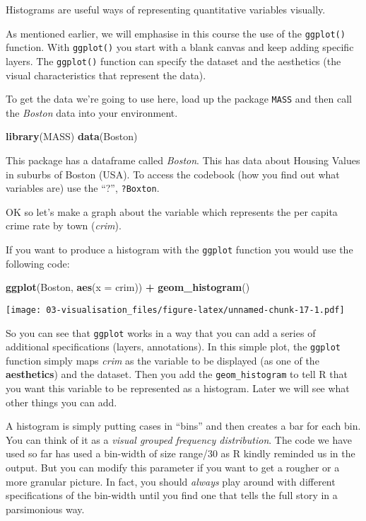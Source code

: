 \documentclass[
]{book}
\newenvironment{Shaded}{\begin{snugshade}}{\end{snugshade}}
\newcommand{\AttributeTok}[1]{\textcolor[rgb]{0.13,0.29,0.53}{#1}}
\newcommand{\FunctionTok}[1]{\textcolor[rgb]{0.13,0.29,0.53}{\textbf{#1}}}
\newcommand{\NormalTok}[1]{#1}
\newcommand{\SpecialCharTok}[1]{\textcolor[rgb]{0.81,0.36,0.00}{\textbf{#1}}}
\begin{document}
Histograms are useful ways of representing quantitative variables visually.

As mentioned earlier, we will emphasise in this course the use of the \texttt{ggplot()} function. With \texttt{ggplot()} you start with a blank canvas and keep adding specific layers. The \texttt{ggplot()} function can specify the dataset and the aesthetics (the visual characteristics that represent the data).

To get the data we're going to use here, load up the package \texttt{MASS} and then call the \emph{Boston} data into your environment.

\begin{Shaded}
\begin{Highlighting}[]
\FunctionTok{library}\NormalTok{(MASS)}
\FunctionTok{data}\NormalTok{(Boston)}
\end{Highlighting}
\end{Shaded}

This package has a dataframe called \emph{Boston}. This has data about Housing Values in suburbs of Boston (USA). To access the codebook (how you find out what variables are) use the ``?'', \texttt{?Boxton}.

OK so let's make a graph about the variable which represents the per capita crime rate by town (\emph{crim}).

If you want to produce a histogram with the \texttt{ggplot} function you would use the following code:

\begin{Shaded}
\begin{Highlighting}[]
\FunctionTok{ggplot}\NormalTok{(Boston, }\FunctionTok{aes}\NormalTok{(}\AttributeTok{x =}\NormalTok{ crim)) }\SpecialCharTok{+} 
  \FunctionTok{geom\_histogram}\NormalTok{()}
\end{Highlighting}
\end{Shaded}

\texttt{[image: 03-visualisation\_files/figure-latex/unnamed-chunk-17-1.pdf]}

So you can see that \texttt{ggplot} works in a way that you can add a series of additional specifications (layers, annotations). In this simple plot, the \texttt{ggplot} function simply maps \emph{crim} as the variable to be displayed (as one of the \textbf{aesthetics}) and the dataset. Then you add the \texttt{geom\_histogram} to tell R that you want this variable to be represented as a histogram. Later we will see what other things you can add.

A histogram is simply putting cases in ``bins'' and then creates a bar for each bin. You can think of it as a \emph{visual grouped frequency distribution}. The code we have used so far has used a bin-width of size range/30 as R kindly reminded us in the output. But you can modify this parameter if you want to get a rougher or a more granular picture. In fact, you should \emph{always} play around with different specifications of the bin-width until you find one that tells the full story in a parsimonious way.
\end{document}
